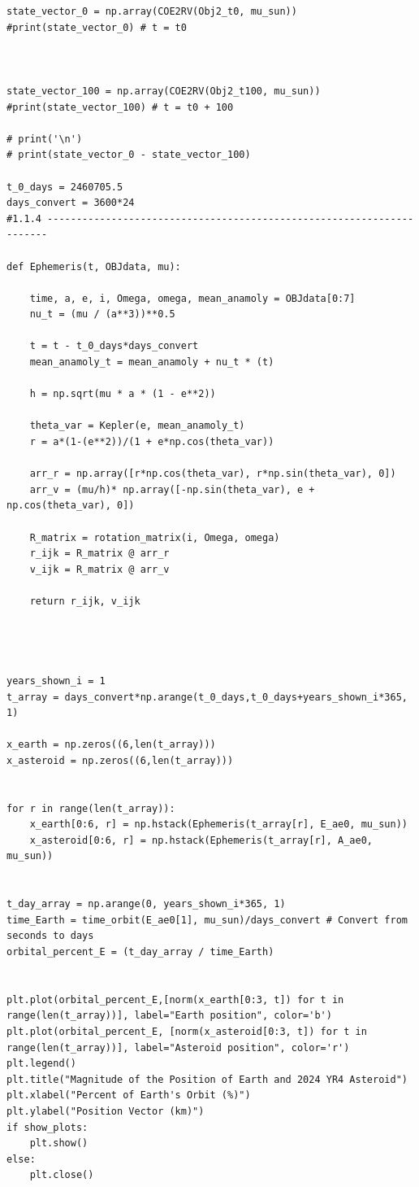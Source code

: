\documentclass[12pt,twocolumn]{article}  %
\begin{document}
\begin{verbatim}
state_vector_0 = np.array(COE2RV(Obj2_t0, mu_sun))
#print(state_vector_0) # t = t0



state_vector_100 = np.array(COE2RV(Obj2_t100, mu_sun))
#print(state_vector_100) # t = t0 + 100

# print('\n')
# print(state_vector_0 - state_vector_100)

t_0_days = 2460705.5
days_convert = 3600*24
#1.1.4 ----------------------------------------------------------------------

def Ephemeris(t, OBJdata, mu):

    time, a, e, i, Omega, omega, mean_anamoly = OBJdata[0:7]
    nu_t = (mu / (a**3))**0.5
    
    t = t - t_0_days*days_convert
    mean_anamoly_t = mean_anamoly + nu_t * (t)

    h = np.sqrt(mu * a * (1 - e**2))
    
    theta_var = Kepler(e, mean_anamoly_t)
    r = a*(1-(e**2))/(1 + e*np.cos(theta_var))
    
    arr_r = np.array([r*np.cos(theta_var), r*np.sin(theta_var), 0])
    arr_v = (mu/h)* np.array([-np.sin(theta_var), e + np.cos(theta_var), 0])
    
    R_matrix = rotation_matrix(i, Omega, omega)
    r_ijk = R_matrix @ arr_r
    v_ijk = R_matrix @ arr_v
    
    return r_ijk, v_ijk




years_shown_i = 1
t_array = days_convert*np.arange(t_0_days,t_0_days+years_shown_i*365, 1) 

x_earth = np.zeros((6,len(t_array)))
x_asteroid = np.zeros((6,len(t_array)))

 
for r in range(len(t_array)):
    x_earth[0:6, r] = np.hstack(Ephemeris(t_array[r], E_ae0, mu_sun))
    x_asteroid[0:6, r] = np.hstack(Ephemeris(t_array[r], A_ae0, mu_sun))
    

t_day_array = np.arange(0, years_shown_i*365, 1)
time_Earth = time_orbit(E_ae0[1], mu_sun)/days_convert # Convert from seconds to days
orbital_percent_E = (t_day_array / time_Earth) 


plt.plot(orbital_percent_E,[norm(x_earth[0:3, t]) for t in range(len(t_array))], label="Earth position", color='b')
plt.plot(orbital_percent_E, [norm(x_asteroid[0:3, t]) for t in range(len(t_array))], label="Asteroid position", color='r')
plt.legend()
plt.title("Magnitude of the Position of Earth and 2024 YR4 Asteroid")
plt.xlabel("Percent of Earth's Orbit (%)")
plt.ylabel("Position Vector (km)")
if show_plots:
    plt.show()
else:
    plt.close()


\end{verbatim}
\end{document}
